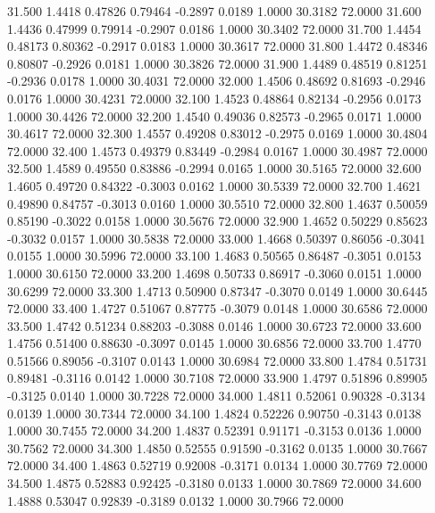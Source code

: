   31.500   1.4418   0.47826   0.79464  -0.2897   0.0189   1.0000  30.3182  72.0000
  31.600   1.4436   0.47999   0.79914  -0.2907   0.0186   1.0000  30.3402  72.0000
  31.700   1.4454   0.48173   0.80362  -0.2917   0.0183   1.0000  30.3617  72.0000
  31.800   1.4472   0.48346   0.80807  -0.2926   0.0181   1.0000  30.3826  72.0000
  31.900   1.4489   0.48519   0.81251  -0.2936   0.0178   1.0000  30.4031  72.0000
  32.000   1.4506   0.48692   0.81693  -0.2946   0.0176   1.0000  30.4231  72.0000
  32.100   1.4523   0.48864   0.82134  -0.2956   0.0173   1.0000  30.4426  72.0000
  32.200   1.4540   0.49036   0.82573  -0.2965   0.0171   1.0000  30.4617  72.0000
  32.300   1.4557   0.49208   0.83012  -0.2975   0.0169   1.0000  30.4804  72.0000
  32.400   1.4573   0.49379   0.83449  -0.2984   0.0167   1.0000  30.4987  72.0000
  32.500   1.4589   0.49550   0.83886  -0.2994   0.0165   1.0000  30.5165  72.0000
  32.600   1.4605   0.49720   0.84322  -0.3003   0.0162   1.0000  30.5339  72.0000
  32.700   1.4621   0.49890   0.84757  -0.3013   0.0160   1.0000  30.5510  72.0000
  32.800   1.4637   0.50059   0.85190  -0.3022   0.0158   1.0000  30.5676  72.0000
  32.900   1.4652   0.50229   0.85623  -0.3032   0.0157   1.0000  30.5838  72.0000
  33.000   1.4668   0.50397   0.86056  -0.3041   0.0155   1.0000  30.5996  72.0000
  33.100   1.4683   0.50565   0.86487  -0.3051   0.0153   1.0000  30.6150  72.0000
  33.200   1.4698   0.50733   0.86917  -0.3060   0.0151   1.0000  30.6299  72.0000
  33.300   1.4713   0.50900   0.87347  -0.3070   0.0149   1.0000  30.6445  72.0000
  33.400   1.4727   0.51067   0.87775  -0.3079   0.0148   1.0000  30.6586  72.0000
  33.500   1.4742   0.51234   0.88203  -0.3088   0.0146   1.0000  30.6723  72.0000
  33.600   1.4756   0.51400   0.88630  -0.3097   0.0145   1.0000  30.6856  72.0000
  33.700   1.4770   0.51566   0.89056  -0.3107   0.0143   1.0000  30.6984  72.0000
  33.800   1.4784   0.51731   0.89481  -0.3116   0.0142   1.0000  30.7108  72.0000
  33.900   1.4797   0.51896   0.89905  -0.3125   0.0140   1.0000  30.7228  72.0000
  34.000   1.4811   0.52061   0.90328  -0.3134   0.0139   1.0000  30.7344  72.0000
  34.100   1.4824   0.52226   0.90750  -0.3143   0.0138   1.0000  30.7455  72.0000
  34.200   1.4837   0.52391   0.91171  -0.3153   0.0136   1.0000  30.7562  72.0000
  34.300   1.4850   0.52555   0.91590  -0.3162   0.0135   1.0000  30.7667  72.0000
  34.400   1.4863   0.52719   0.92008  -0.3171   0.0134   1.0000  30.7769  72.0000
  34.500   1.4875   0.52883   0.92425  -0.3180   0.0133   1.0000  30.7869  72.0000
  34.600   1.4888   0.53047   0.92839  -0.3189   0.0132   1.0000  30.7966  72.0000
